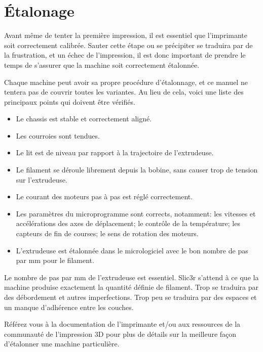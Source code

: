 
\section{\'Etalonage}
\label{calibration}

Avant m\^eme de tenter la premi\`ere impression, il est essentiel que l'imprimante soit correctement calibr\'ee. Sauter cette \'etape ou se pr\'ecipiter se traduira par de la frustration, et un \'echec de l'impression, il est donc important de prendre le temps de s'assurer que la machine soit correctement \'etalonn\'ee.

Chaque machine peut avoir sa propre proc\'edure d'\'etalonnage, et ce manuel ne tentera pas de couvrir toutes les variantes. Au lieu de cela, voici une liste des principaux points qui doivent \^etre v\'erifi\'es.

\begin{itemize}
\item Le chassis est stable et correctement align\'e.
\item Les courroies sont tendues.
\item Le lit est de niveau par rapport \`a la trajectoire de l'extrudeuse.
\item Le filament se d\'eroule librement depuis la bobine, sans causer trop de tension sur l'extrudeuse.
\item Le courant des moteurs pas \`a pas est r\'egl\'e correctement.
\item Les param\`etres du microprogramme sont corrects, notamment: les vitesses et acc\'el\'erations des axes de d\'eplacement; le contr\^ole de la temp\'erature; les capteurs de fin de courses; le sens de rotation des moteurs.
\item L'extrudeuse est \'etalonn\'ee dans le micrologiciel avec le bon nombre de pas par mm pour le filament.
\end{itemize}

Le nombre de pas par mm de l'extrudeuse est essentiel. Slic3r s'attend \`a ce que la machine produise exactement la quantit\'e d\'efinie de filament. Trop se traduira par des d\'ebordement et autres imperfections. Trop peu se traduira par des espaces et un manque d'adh\'erence entre les couches.

R\'ef\'erez vous \`a la documentation de l'imprimante et/ou aux ressources de la communaut\'e de l'impression 3D pour plus de d\'etails sur la meilleure fa\c{c}on d'\'etalonner une machine particuli\`ere.
